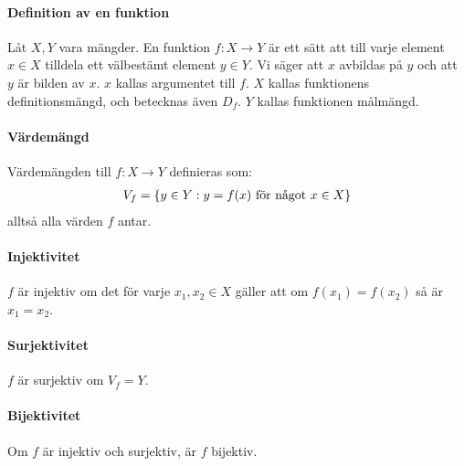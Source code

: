 \paragraph{Definition av en funktion}

Låt $X, Y$ vara mängder. En funktion $f: X \rightarrow Y$ är ett sätt att till varje element $x \in X$ tilldela ett välbestämt element $y \in Y$. Vi säger att $x$ avbildas på $y$ och att $y$ är bilden av $x$. $x$ kallas argumentet till $f$. $X$ kallas funktionens definitionsmängd, och betecknas även $D_f$. $Y$ kallas funktionen målmängd.

\paragraph{Värdemängd}

Värdemängden till $f: X\rightarrow Y$ definieras som:
\begin{align}
	V_f=\left \{y\in Y: y=f(x)\textnormal{ för något }x\in X\right \}\nonumber
\end{align}
alltså alla värden $f$ antar.

\paragraph{Injektivitet}

$f$ är injektiv om det för varje $x_1, x_2 \in X$ gäller att om $f(x_1)=f(x_2)$ så är $x_1=x_2$.

\paragraph{Surjektivitet}

$f$ är surjektiv om $V_f=Y$.

\paragraph{Bijektivitet}

Om $f$ är injektiv och surjektiv, är $f$ bijektiv.